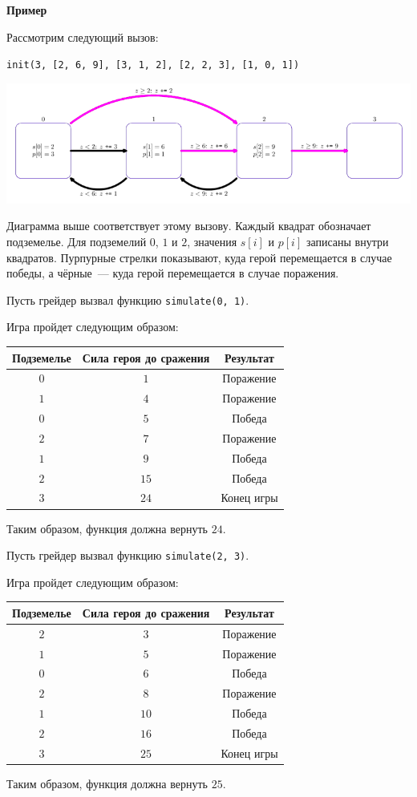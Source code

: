\textbf{Пример}

Рассмотрим следующий вызов:

\texttt{init(3, [2, 6, 9], [3, 1, 2], [2, 2, 3], [1, 0, 1])}

\includegraphics[scale=0.6]{1.png}

Диаграмма выше соответствует этому вызову. Каждый квадрат обозначает подземелье. Для подземелий $0$, $1$ и $2$, значения $s[i]$ и $p[i]$ записаны внутри квадратов.
Пурпурные стрелки показывают, куда герой перемещается в случае победы, а чёрные~--- куда герой перемещается в случае поражения.

Пусть грейдер вызвал функцию \texttt{simulate(0, 1)}.

Игра пройдет следующим образом:

\begin{center}
\renewcommand{\arraystretch}{1.5}
\begin{tabular}{|c|c|c|}
\hline
 Подземелье & Сила героя до сражения & Результат \\
\hline
 $0$ & $1$ & Поражение \\
\hline
 $1$ & $4$ & Поражение \\
\hline
 $0$ & $5$ & Победа \\
\hline
 $2$ & $7$ & Поражение \\
\hline
 $1$ & $9$ & Победа \\
\hline
 $2$ & $15$ & Победа \\
\hline
 $3$ & $24$ & Конец игры \\
\hline
\end{tabular}
\end{center}

Таким образом, функция должна вернуть $24$.

Пусть грейдер вызвал функцию \texttt{simulate(2, 3)}.

Игра пройдет следующим образом:

\begin{center}
\renewcommand{\arraystretch}{1.5}
\begin{tabular}{|c|c|c|}
\hline
 Подземелье & Сила героя до сражения & Результат \\
\hline
 $2$ & $3$ & Поражение \\
\hline
 $1$ & $5$ & Поражение \\
\hline
 $0$ & $6$ & Победа \\
\hline
 $2$ & $8$ & Поражение \\
\hline
 $1$ & $10$ & Победа \\
\hline
 $2$ & $16$ & Победа \\
\hline
 $3$ & $25$ & Конец игры \\
\hline
\end{tabular}
\end{center}

Таким образом, функция должна вернуть $25$.